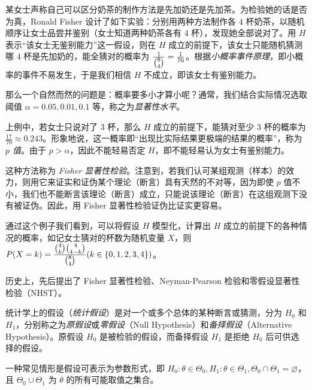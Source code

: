 \documentclass[../main.tex]{subfiles}
\begin{document}
\begin{example}
    某女士声称自己可以区分奶茶的制作方法是先加奶还是先加茶。为检验她的话是否为真，Ronald Fisher 设计了如下实验：分别用两种方法制作各 $4$ 杯奶茶，以随机顺序让女士品尝并鉴别（女士知道两种奶茶各有 $4$ 杯），发现她全部说对了。用 $H$ 表示“该女士无鉴别能力”这一假设，则在 $H$ 成立的前提下，该女士只能随机猜测哪 $4$ 杯是先加奶的，能全猜对的概率为 $\frac1{\tbinom 84}=\frac 1{70}$。根据\emph{小概率事件原理}，即小概率的事件不易发生，于是我们相信 $H$ 不成立，即该女士有鉴别能力。
\end{example}

那么一个自然而然的问题是：概率要多小才算小呢？通常，我们结合实际情况选取阈值 $\alpha=0.05,0.01,0.1$ 等，称之为\emph{显著性水平}。

上例中，若女士只说对了 $3$ 杯，那么 $H$ 成立的前提下，能猜对至少 $3$ 杯的概率为 $\frac{17}{70}\approx0.243$。形象地说，这一概率即“出现比实际结果更极端的结果的概率”，称为 \emph{$p$ 值}。由于 $p>\alpha$，因此不能轻易否定 $H$，即不能轻易认为女士有鉴别能力。

这种方法称为 \emph{Fisher 显著性检验}。注意到，若我们认可某组观测（样本）的效力，则用它来证实和证伪某个理论（断言）具有天然的不对等，因为即使 $p$ 值不小，我们也不能断言该理论（断言）成立，只能说该理论（断言）在这组观测下没有被证伪。因此，用 Fisher 显著性检验证伪比证实更容易。

通过这个例子我们看到，可以将假设 $H$ 模型化，计算出 $H$ 成立的前提下的各种情况的概率，如记女士猜对的杯数为随机变量 $X$，则 $P(X=k)=\frac{\tbinom 4k\tbinom 4{4-k}}{\tbinom 84}(k\in\{0,1,2,3,4\})$。

历史上，先后提出了 Fisher 显著性检验、Neyman-Pearson 检验和零假设显著性检验（NHST）。

统计学上的假设（\emph{统计假设}）是对一个或多个总体的某种断言或猜测，分为 $H_0$ 和 $H_1$，分别称之为\emph{原假设}或\emph{零假设}（Null Hypothesis）和\emph{备择假设}（Alternative Hypothesis）。原假设 $H_0$ 是被检验的假设，而备择假设 $H_1$ 是拒绝 $H_0$ 后可供选择的假设。

一种常见情形是假设可表示为参数形式，即 $H_0:\theta\in\Theta_0,H_1:\theta\in\Theta_1,\Theta_0\cap\Theta_1=\varnothing$，且 $\Theta_0\cup\Theta_1$ 为 $\theta$ 的所有可能取值之集合。
\end{document}
